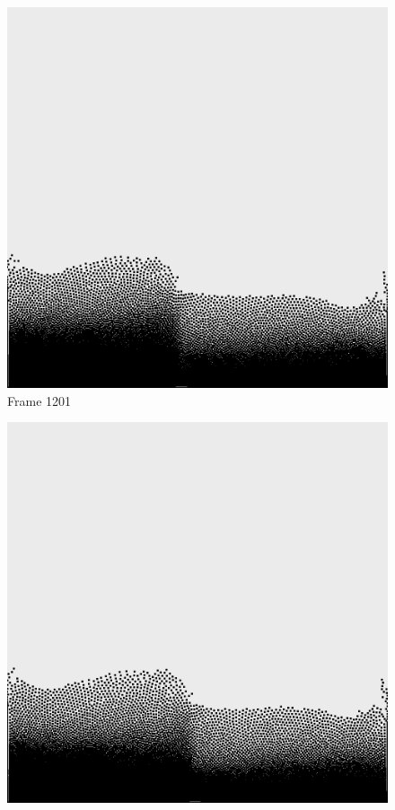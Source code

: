 \documentclass[a4paper, 12pt, oneside]{book}
\begin{document}
\begin{figure}[!ht]
        \begin{center}
            \includegraphics[width=\linewidth]{images/test_case_2/1201.png}
            Frame 1201
        \end{center}
    \endminipage
    \hfill
        \begin{center}
            \includegraphics[width=\linewidth]{images/test_case_2/1221.png}

\end{center}
\end{figure}
\end{document}
